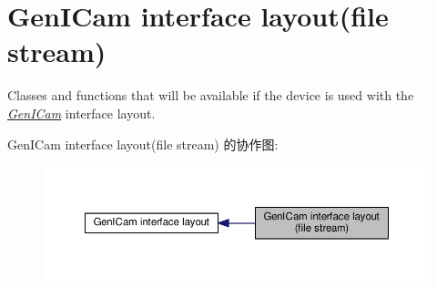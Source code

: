 \hypertarget{group___gen_i_cam_interface_file_stream}{\section{Gen\+I\+Cam interface layout(file stream)}
\label{group___gen_i_cam_interface_file_stream}
}


Classes and functions that will be available if the device is used with the {\itshape \hyperlink{namespacemv_i_m_p_a_c_t_1_1acquire_1_1_gen_i_cam}{Gen\+I\+Cam}} interface layout.  


Gen\+I\+Cam interface layout(file stream) 的协作图\+:
\nopagebreak
\begin{figure}[H]
\begin{center}
\leavevmode
\includegraphics[width=350pt]{group___gen_i_cam_interface_file_stream}
\end{center}
\end{figure}
